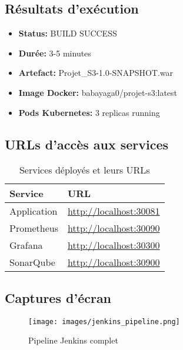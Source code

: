 \documentclass[12pt,a4paper]{article}
\begin{document}
\subsection{Résultats d'exécution}

\begin{tcolorbox}[colback=green!5!white,colframe=green!75!black,title=Résumé du build]
    \begin{itemize}
        \item \textbf{Status:} BUILD SUCCESS
        \item \textbf{Durée:} 3-5 minutes
        \item \textbf{Artefact:} Projet\_S3-1.0-SNAPSHOT.war
        \item \textbf{Image Docker:} babayaga0/projet-s3:latest
        \item \textbf{Pods Kubernetes:} 3 replicas running
    \end{itemize}
\end{tcolorbox}

\subsection{URLs d'accès aux services}

\begin{table}[H]
\centering
\begin{tabular}{|l|l|}
\hline
\textbf{Service} & \textbf{URL} \\ \hline
Application & \url{http://localhost:30081} \\ \hline
Prometheus & \url{http://localhost:30090} \\ \hline
Grafana & \url{http://localhost:30300} \\ \hline
SonarQube & \url{http://localhost:30900} \\ \hline
\end{tabular}
\caption{Services déployés et leurs URLs}
\label{tab:services}
\end{table}

\subsection{Captures d'écran}

\begin{figure}[H]
    \centering
    \texttt{[image: images/jenkins\_pipeline.png]}
    \caption{Pipeline Jenkins complet}
    \label{fig:jenkins_pipeline}
\end{figure}
\end{document}
